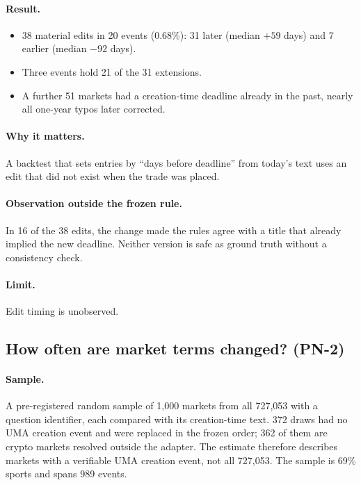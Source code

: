 \documentclass[10pt]{article}
\begin{document}
\paragraph{Result.}
\begin{itemize}[nosep]
  \item 38 material edits in 20 events (0.68\%): 31 later (median $+59$ days)
        and 7 earlier (median $-92$ days).
  \item Three events hold 21 of the 31 extensions.
  \item A further 51 markets had a creation-time deadline already in the past,
        nearly all one-year typos later corrected.
\end{itemize}

\paragraph{Why it matters.} A backtest that sets entries by ``days before
deadline'' from today's text uses an edit that did not exist when the trade was
placed.

\paragraph{Observation outside the frozen rule.} In 16 of the 38 edits, the
change made the rules agree with a title that already implied the new deadline.
Neither version is safe as ground truth without a consistency check.

\paragraph{Limit.} Edit timing is unobserved.

\subsection{How often are market terms changed? (PN-2)}

\paragraph{Sample.} A pre-registered random sample of 1,000 markets from all
727,053 with a question identifier, each compared with its creation-time text.
372 draws had no UMA creation event and were replaced in the frozen order; 362
of them are crypto markets resolved outside the adapter. The estimate therefore
describes markets with a verifiable UMA creation event, not all 727,053. The
sample is 69\% sports and spans 989 events.
\end{document}
